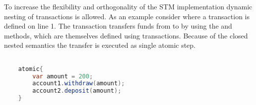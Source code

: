 To increase the flexibility and orthogonality of the \ac{STM} implementation dynamic nesting of transactions is allowed. As an example consider  where a transaction is defined on line 1. The transaction transfers funds from  to  by using the  and  methods, which are themselves defined using transactions. Because of the closed nested semantics the transfer is executed as single atomic step.

\begin{lstlisting}[label=lst:stm_nested_transactions_real,
  caption={Dynamically nested transactions},
  language=Java,  
  showspaces=false,
  showtabs=false,
  breaklines=true,
  showstringspaces=false,
  breakatwhitespace=true,
  commentstyle=\color{greencomments},
  keywordstyle=\color{bluekeywords},
  stringstyle=\color{redstrings},
  morekeywords={atomic, retry, orElse, var}]  % Start your code-block

	atomic{
		var amount = 200;
		account1.withdraw(amount);
		account2.deposit(amount);
	}
       
\end{lstlisting}

%
%
%
%    
%
%    
         
         



\worksheetend
